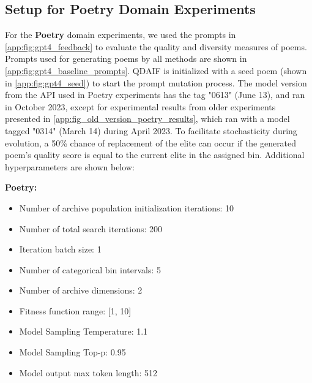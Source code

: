 \subsection{Setup for Poetry Domain Experiments}\label{app:poetry_setup}
For the \textbf{Poetry} domain experiments, we used the prompts in \cref{app:fig:gpt4_feedback} to evaluate the quality and diversity measures of poems. Prompts used for generating poems by all methods are shown in \cref{app:fig:gpt4_baseline_prompts}. QDAIF is initialized with a seed poem (shown in \cref{app:fig:gpt4_seed}) to start the prompt mutation process. The model version from the API used in Poetry experiments has the tag "0613" (June 13), and ran in October 2023, except for experimental results from older experiments presented in \cref{app:fig_old_version_poetry_results}, which ran with a model tagged "0314" (March 14) during April 2023. To facilitate stochasticity during evolution, a 50\% chance of replacement of the elite can occur if the generated poem's quality score is equal to the current elite in the assigned bin. Additional hyperparameters are shown below:

\textbf{Poetry:}
\begin{itemize}
    \item Number of archive population initialization iterations: 10
    \item Number of total search iterations: 200
    \item Iteration batch size: 1
    \item Number of categorical bin intervals: 5
    \item Number of archive dimensions: 2
    \item Fitness function range: [1, 10]
    \item Model Sampling Temperature: 1.1
    \item Model Sampling Top-p: 0.95
    \item Model output max token length: 512
\end{itemize}

